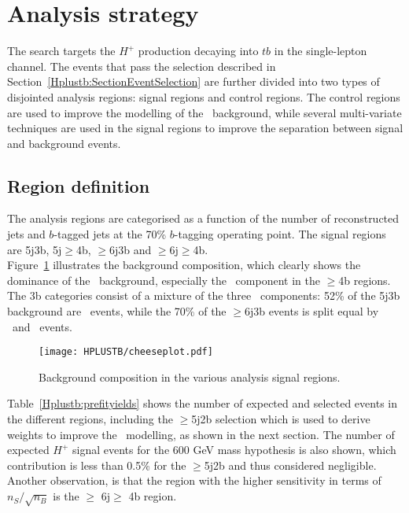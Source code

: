 \section{Analysis strategy}
The search targets the $H^+$ production decaying into $tb$ in the single-lepton channel. The events that pass the selection described in Section~\ref{Hplustb:SectionEventSelection} are further divided into two types of disjointed analysis regions: signal regions and control regions. The control regions are used to improve the modelling of the \ttjets\ background, while several multi-variate techniques are used in the signal regions to improve the separation between signal and background events.

\subsection{Region definition}

The analysis regions are categorised as a function of the number of reconstructed jets and $b$-tagged jets at the 70\% $b$-tagging operating point. The signal regions are 5j3b, 5j$\geq$4b, $\geq$6j3b and $\geq$6j$\geq$4b.\\

Figure~\ref{Hplustb:cheeseplots} illustrates the background composition, which clearly shows the dominance of the \ttbar\ background, especially the \ttb\ component in the $\geq$4b regions. The 3b categories consist of a mixture of the three \ttbar\ components: 52\% of the 5j3b background are \ttl\ events, while the 70\% of the $\geq$6j3b events is split equal by \ttb\ and \ttl\ events.\\

\begin{figure}[htbp]
    \RawFloats
    \begin{center}
    \texttt{[image: HPLUSTB/cheeseplot.pdf]}
    \caption{
        Background composition in the various analysis signal regions.
    }
    \label{Hplustb:cheeseplots}
    \end{center}
\end{figure}

Table~\ref{Hplustb:prefityields} shows the number of expected and selected events in the different regions, including the $\geq$5j2b selection which is used to derive weights to improve the \ttbar\ modelling, as shown in the next section. The number of expected $H^+$ signal events for the 600 GeV mass hypothesis is also shown, which contribution is less than 0.5\% for the $\geq$5j2b and thus considered negligible. Another observation, is that the region with the higher sensitivity in terms of $n_S/\sqrt{n_B}$ is the $\geq$ 6j$\geq$ 4b region.\\  %

